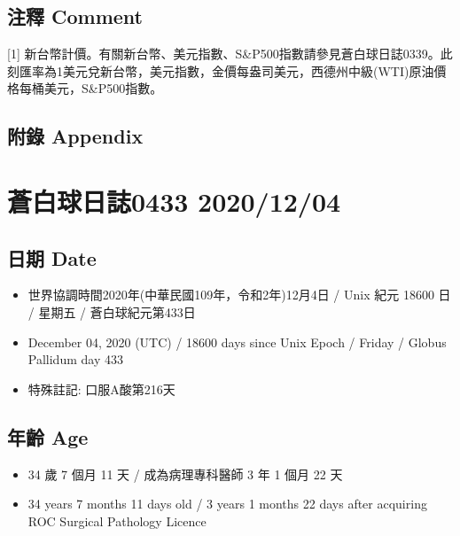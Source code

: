 \documentclass[a5paper, 11pt
]{book}
\providecommand{\tightlist}{%
  \setlength{\itemsep}{0pt}\setlength{\parskip}{0pt}}
\begin{document}
\hypertarget{ux6ce8ux91cb-comment-2}{%
\subsection{注釋 Comment}\label{ux6ce8ux91cb-comment-2}}

{[}1{]}
新台幣計價。有關新台幣、美元指數、S\&P500指數請參見蒼白球日誌0339。此刻匯率為1美元兌新台幣，美元指數，金價每盎司美元，西德州中級(WTI)原油價格每桶美元，S\&P500指數。

\hypertarget{ux9644ux9304-appendix-2}{%
\subsection{附錄 Appendix}\label{ux9644ux9304-appendix-2}}

\hypertarget{ux84bcux767dux7403ux65e5ux8a8c0433-20201204}{%
\section{蒼白球日誌0433
2020/12/04}\label{ux84bcux767dux7403ux65e5ux8a8c0433-20201204}}

\hypertarget{ux65e5ux671f-date-3}{%
\subsection{日期 Date}\label{ux65e5ux671f-date-3}}

\begin{itemize}
\tightlist
\item
  世界協調時間2020年(中華民國109年，令和2年)12月4日 / Unix 紀元 18600 日
  / 星期五 / 蒼白球紀元第433日
\item
  December 04, 2020 (UTC) / 18600 days since Unix Epoch / Friday /
  Globus Pallidum day 433
\item
  特殊註記: 口服A酸第216天
\end{itemize}

\hypertarget{ux5e74ux9f61-age-3}{%
\subsection{年齡 Age}\label{ux5e74ux9f61-age-3}}

\begin{itemize}
\tightlist
\item
  34 歲 7 個月 11 天 / 成為病理專科醫師 3 年 1 個月 22 天
\item
  34 years 7 months 11 days old / 3 years 1 months 22 days after
  acquiring ROC Surgical Pathology Licence
\end{itemize}
\end{document}
